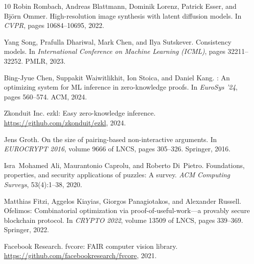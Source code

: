 \documentclass[11pt]{article}
\begin{document}
\begin{thebibliography}{10}
Robin Rombach, Andreas Blattmann, Dominik Lorenz, Patrick Esser, and Bj{\"o}rn Ommer.
\newblock High-resolution image synthesis with latent diffusion models.
\newblock In \emph{CVPR}, pages 10684--10695, 2022.

Yang Song, Prafulla Dhariwal, Mark Chen, and Ilya Sutskever.
\newblock Consistency models.
\newblock In \emph{International Conference on Machine Learning (ICML)}, pages 32211--32252. PMLR, 2023.

Bing-Jyue Chen, Suppakit Waiwitlikhit, Ion Stoica, and Daniel Kang.
: An optimizing system for {ML} inference in zero-knowledge proofs.
\newblock In \emph{EuroSys '24}, pages 560--574. ACM, 2024.

Zkonduit Inc.
\newblock ezkl: Easy zero-knowledge inference.
\newblock \url{https://github.com/zkonduit/ezkl}, 2024.

Jens Groth.
\newblock On the size of pairing-based non-interactive arguments.
\newblock In \emph{EUROCRYPT 2016}, volume 9666 of LNCS, pages 305--326. Springer, 2016.

Isra~Mohamed Ali, Maurantonio Caprolu, and Roberto Di~Pietro.
\newblock Foundations, properties, and security applications of puzzles: A survey.
\newblock \emph{ACM Computing Surveys}, 53(4):1--38, 2020.

Matthias Fitzi, Aggelos Kiayias, Giorgos Panagiotakos, and Alexander Russell.
\newblock Ofelimos: Combinatorial optimization via proof-of-useful-work---a provably secure blockchain protocol.
\newblock In \emph{CRYPTO 2022}, volume 13509 of LNCS, pages 339--369. Springer, 2022.

Facebook Research.
\newblock fvcore: {FAIR} computer vision library.
\newblock \url{https://github.com/facebookresearch/fvcore}, 2021.

\end{thebibliography}
\end{document}

